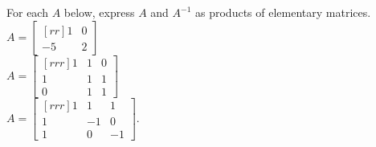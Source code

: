 \ii For each $A$ below, express $A$ and $A^{-1}$ as products of elementary matrices.
\vspace{.1in} \\
\bb
\ii $A=\begin{bmatrix}[rr]
1&0\\-5&2
\end{bmatrix}$
\vspace{.1in} \\
\ii $A=\begin{bmatrix}[rrr]
1&1&0\\
1&1&1\\
0&1&1
\end{bmatrix}$
\vspace{.1in} \\
\ii $A=\begin{bmatrix}[rrr] 1&1&1\\ 1&-1&0\\ 1&0&-1\end{bmatrix}$.

